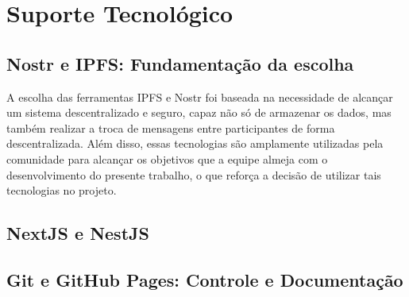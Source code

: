 \chapter[Elementos do Texto]{Suporte Tecnológico}

\section{Nostr e IPFS: Fundamentação da escolha}
A escolha das ferramentas IPFS e Nostr foi baseada na necessidade de alcançar um sistema descentralizado e seguro, capaz não só de armazenar os dados, mas também realizar a troca de mensagens entre participantes de forma descentralizada. Além disso, essas tecnologias são amplamente utilizadas pela comunidade para alcançar os objetivos que a equipe almeja com o desenvolvimento do presente trabalho, o que reforça a decisão de utilizar tais tecnologias no projeto.

\section{NextJS e NestJS}

\section{Git e GitHub Pages: Controle e Documentação}
